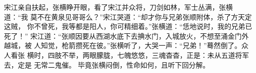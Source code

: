 宋江亲自扶起，张横睁开眼，看了宋江并众将，刀剑如林，军士丛满，张横道：“我
莫不在黄泉见哥哥么？”宋江哭道：“却才你与兄弟张顺附体，杀了方天定这贼，
你不曾死，我等都是阳人，你可精细着。”张横道：“恁地说时，我的兄弟已死了！”
宋江道：“张顺因要从西湖水底下去捵水门，入城放火，不想至涌金门外越城，被
人知觉，枪箭攒死在彼。”张横听了，大哭一声：“兄弟！”蓦然倒了。众人看张
横时，四肢不举，两眼朦胧，七魄悠悠，三魂杳杳，正是：未从五道将军去，定是
无常二鬼催。
毕竟张横闷倒，性命如何，且听下回分解。